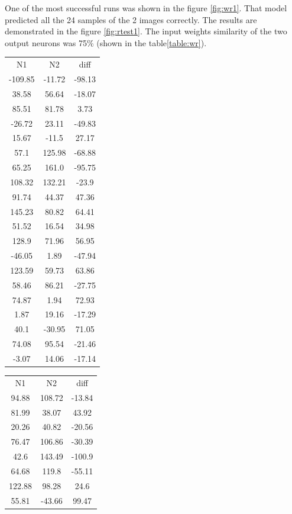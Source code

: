 \documentclass{article}
\begin{document}
	One of the most successful runs was shown in the figure \ref{fig:wr1}. That model predicted all the 24 samples of the 2 images correctly. The results are demonstrated in the figure \ref{fig:rtest1}. The input weights similarity of the two output neurons was 75\% (shown in the table\ref{table:wr}).
	\begin{table}
		\begin{tabular}{|c|c|c|}
			\hline
			N1 & N2 & diff \\
			-109.85 & -11.72 & -98.13\\
			38.58 & 56.64 & -18.07\\
			85.51 & 81.78 & 3.73\\
			-26.72 & 23.11 & -49.83\\
			15.67 & -11.5 & 27.17\\
			57.1 & 125.98 & -68.88\\
			65.25 & 161.0 & -95.75\\
			108.32 & 132.21 & -23.9\\
			91.74 & 44.37 & 47.36\\
			145.23 & 80.82 & 64.41\\
			51.52 & 16.54 & 34.98\\
			128.9 & 71.96 & 56.95\\
			-46.05 & 1.89 & -47.94\\
			123.59 & 59.73 & 63.86\\
			58.46 & 86.21 & -27.75\\
			74.87 & 1.94 & 72.93\\
			1.87 & 19.16 & -17.29\\
			40.1 & -30.95 & 71.05\\
			74.08 & 95.54 & -21.46\\
			-3.07 & 14.06 & -17.14\\
			\hline
		\end{tabular}
		\hspace{1.5cm}
		\begin{tabular}{|c|c|c|}
			\hline
			N1 & N2 & diff \\
			94.88 & 108.72 & -13.84\\
			81.99 & 38.07 & 43.92\\
			20.26 & 40.82 & -20.56\\
			76.47 & 106.86 & -30.39\\
			42.6 & 143.49 & -100.9\\
			64.68 & 119.8 & -55.11\\
			122.88 & 98.28 & 24.6\\
			55.81 & -43.66 & 99.47\\

\end{tabular}
\end{table}
\end{document}
